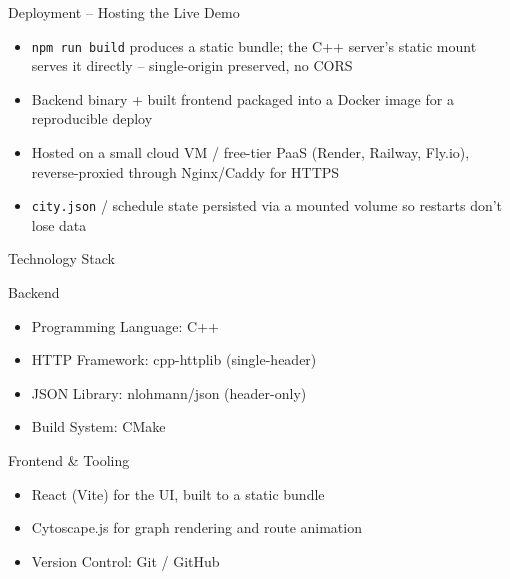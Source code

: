 \documentclass[aspectratio=169,11pt]{beamer}
\begin{document}
\begin{frame}{Deployment -- Hosting the Live Demo}
\small
\begin{center}
\end{center}
\vspace{2mm}
\begin{itemize}\itemsep3pt
\item \texttt{npm run build} produces a static bundle; the C++ server's static mount serves it directly -- single-origin preserved, no CORS
\item Backend binary + built frontend packaged into a Docker image for a reproducible deploy
\item Hosted on a small cloud VM / free-tier PaaS (Render, Railway, Fly.io), reverse-proxied through Nginx/Caddy for HTTPS
\item \texttt{city.json} / schedule state persisted via a mounted volume so restarts don't lose data
\end{itemize}
\end{frame}

\begin{frame}{Technology Stack}
\begin{block}{Backend}
\begin{itemize}\itemsep3pt
\item Programming Language: C++
\item HTTP Framework: cpp-httplib (single-header)
\item JSON Library: nlohmann/json (header-only)
\item Build System: CMake
\end{itemize}
\end{block}
\vspace{3mm}
\begin{block}{Frontend \& Tooling}
\begin{itemize}\itemsep3pt
\item React (Vite) for the UI, built to a static bundle
\item Cytoscape.js for graph rendering and route animation
\item Version Control: Git / GitHub
\end{itemize}
\end{block}
\end{frame}
\end{document}
